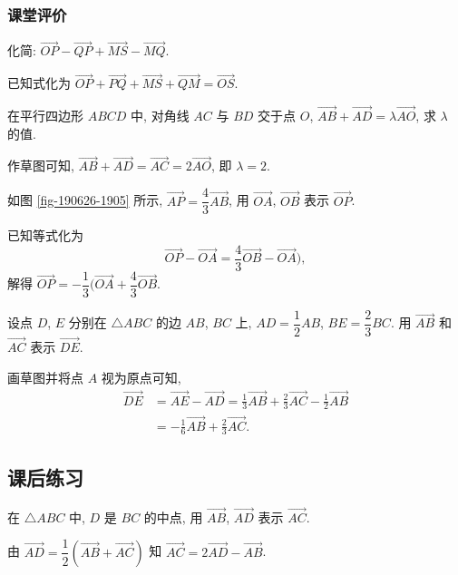\subsubsection{课堂评价}
\begin{exercise}
    化简: $\overrightarrow{OP}- \overrightarrow{QP}+ 
    \overrightarrow{MS}- \overrightarrow{MQ}$.
\end{exercise}
\beginsolution
    已知式化为 $\overrightarrow{OP}+ \overrightarrow{PQ}+ 
    \overrightarrow{MS}+ \overrightarrow{QM}= \overrightarrow{OS}$.
\endsolution

\begin{exercise}
    在平行四边形 $ABCD$ 中, 对角线 $AC$ 与 $BD$ 交于点 $O$, $\overrightarrow{AB}+ \overrightarrow{AD}= \lambda\overrightarrow{AO}$, 求 $\lambda$ 的值.
\end{exercise}
\beginsolution
    作草图可知, $\overrightarrow{AB}+ \overrightarrow{AD}= \overrightarrow{AC}= 2\overrightarrow{AO}$, 即 $\lambda=2$.
\endsolution

\begin{exercise}
    如图 \ref{fig-190626-1905} 所示, $\overrightarrow{AP}= \dfrac43 \overrightarrow{AB}$, 用 $\overrightarrow{OA}$, $\overrightarrow{OB}$ 表示 $\overrightarrow{OP}$.
\end{exercise}
\beginsolution
    已知等式化为
    \[\overrightarrow{OP}- \overrightarrow{OA}
    = \dfrac43\overrightarrow{OB}- \overrightarrow{OA}),\]
    解得 $\overrightarrow{OP}
    = -\dfrac13(\overrightarrow{OA}+ \dfrac43\overrightarrow{OB}$.
\endsolution

\begin{exercise}
    设点 $D$, $E$ 分别在 $\triangle ABC$ 的边 $AB$, $BC$ 上, $AD=\dfrac12 AB$, $BE=\dfrac23 BC$. 用 $\overrightarrow{AB}$ 和 $\overrightarrow{AC}$ 表示 $\overrightarrow{DE}$.
\end{exercise}
\beginsolution
    画草图并将点 $A$ 视为原点可知,
    \[\begin{aligned}
        \overrightarrow{DE}
        &= \overrightarrow{AE}- \overrightarrow{AD}
         = \frac13\overrightarrow{AB}+ \frac23\overrightarrow{AC}- \frac12\overrightarrow{AB}\\
        &= -\frac16\overrightarrow{AB}+ \frac23\overrightarrow{AC}.
    \end{aligned}\]
\endsolution

\subsection{课后练习}
\begin{exercise}
    在 $\triangle ABC$ 中, $D$ 是 $BC$ 的中点, 用 $\overrightarrow{AB}$, $\overrightarrow{AD}$ 表示 $\overrightarrow{AC}$.
\end{exercise}
\beginsolution
    由 $\overrightarrow{AD}= \dfrac12(\overrightarrow{AB}+ \overrightarrow{AC})$ 知 $\overrightarrow{AC}= 2\overrightarrow{AD}- \overrightarrow{AB}$.
\endsolution

